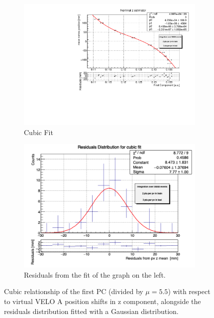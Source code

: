 \begin{samepage}
\begin{figure}
    \label{fig:y_veloA_MC}
\end{figure}
\begin{figure}
    \centering
    \begin{subfigure}{0.48\textwidth}
    \includegraphics[width=\linewidth]{figures/z_fit_veloA_normalised.pdf}
    \caption{Cubic Fit}\label{fig:z_veloA_fit_MC}
    \end{subfigure}
    \begin{subfigure}{0.48\textwidth}
    \includegraphics[width=\linewidth]{figures/z_res_veloA_MC.png}
    \caption{Residuals from the fit of the graph on the left. }\label{fig:z_veloA_res_MC}
    \end{subfigure}
    \caption{Cubic relationship of the first PC (divided by $\mu=5.5$) with respect to virtual VELO A position shifts in z component, alongside the residuals distribution fitted with a Gaussian distribution.}
    \label{fig:z_veloA_MC}
\end{figure}
\end{samepage}
